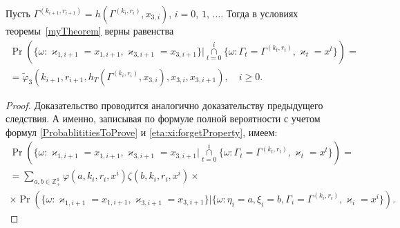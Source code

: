 \documentclass[a4paper,12pt,russian]{extarticle}
\begin{document}
\begin{corollary}
Пусть $\Gamma^{(k_{i+1},r_{i+1})}=h(\Gamma^{(k_i,r_i)},x_{3,i})$, $i=0$, $1$, $\ldots$. Тогда в условиях теоремы~\ref{myTheorem} верны равенства
\begin{multline}
\Pr (\{ \omega \colon \varkappa_{1,i+1} = x_{1,i+1}, \varkappa_{3,i+1} = x_{3,i+1}\} |\mathop{\cap}\limits_{t=0}^{i}\{\omega\colon \Gamma_t=\Gamma^{(k_t,r_t)}, \varkappa_t=x^t\})=\\
=\widetilde{\varphi}_3(k_{i+1},r_{i+1},h_T(\Gamma^{(k_i,r_i)},x_{3,i}),x_{3,i},x_{3,i+1}), \quad i \geqslant 0.
\label{kappa:1:kappa:3:conditional}
\end{multline}
\end{corollary}
\begin{proof}
Доказательство проводится аналогично доказательству предыдущего следствия. А именно, записывая по формуле полной вероятности с учетом формул \eqref{ProbablititiesToProve} и \eqref{eta:xi:forgetProperty}, имеем:
\begin{multline*}
\Pr (\{ \omega \colon \varkappa_{1,i+1} = x_{1,i+1}, \varkappa_{3,i+1} = x_{3,i+1} |\mathop{\cap}\limits_{t=0}^{i}\{\omega\colon \Gamma_t=\Gamma^{(k_t,r_t)}, \varkappa_t=x^t\}) =\\
=\sum_{a,b\in \mathbb{Z}_+^4} \varphi(a,k_i,r_i,x^i)\zeta(b,k_i,r_i,x^i) \times\\
\times \Pr (\{ \omega \colon \varkappa_{1,i+1} = x_{1,i+1}, \varkappa_{3,i+1} = x_{3,i+1}\} |\{\omega\colon \eta_i=a, \xi_i=b, \Gamma_i=\Gamma^{(k_i,r_i)}, \varkappa_i=x^i\}).
\end{multline*}



\end{proof}
\end{document}
